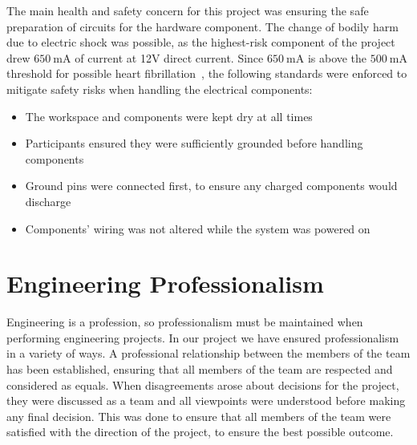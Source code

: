 \documentclass[12pt]{report}
\let\Oldsection\section
\renewcommand{\section}{\FloatBarrier\Oldsection}
\begin{document}
The main health and safety concern for this project was ensuring the safe preparation of circuits for the hardware 
component. The change of bodily harm due to electric shock was possible, as the highest-risk component of the project 
drew $\SI{650}{\milli\ampere}$ of current at 12V direct current. Since $\SI{650}{\milli\ampere}$ is above the 
$\SI{500}{\milli\ampere}$ threshold for possible heart fibrillation~\autocite{CURRENTDANGER}, the following standards
were enforced to mitigate safety risks when handling the electrical components:
\begin{itemize}
    \item The workspace and components were kept dry at all times
    \item Participants ensured they were sufficiently grounded before handling components
    \item Ground pins were connected first, to ensure any charged components would discharge
    \item Components' wiring was not altered while the system was powered on
\end{itemize}

\section{Engineering Professionalism} \label{engineering-professionalism}


Engineering is a profession, so professionalism must be maintained when performing engineering projects. In our project
we have ensured professionalism in a variety of ways. A professional relationship between the members of the team has
been established, ensuring that all members of the team are respected and considered as equals. When disagreements arose
about decisions for the project, they were discussed as a team and all viewpoints were understood before making any final
decision. This was done to ensure that all members of the team were satisfied with the direction of the project, to
ensure the best possible outcome.
\end{document}
